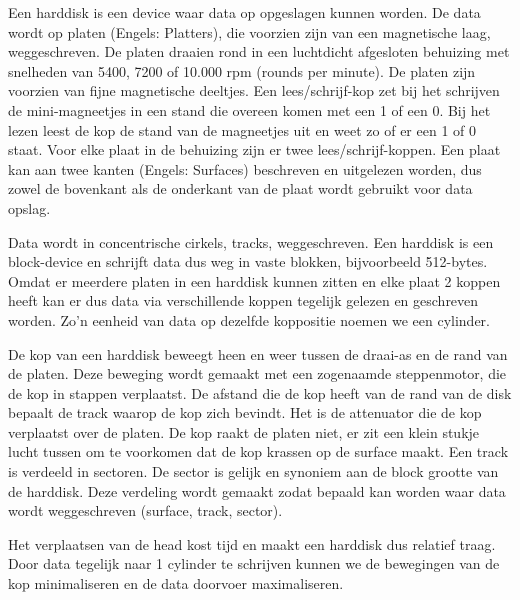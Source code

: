 Een harddisk is een device waar data op opgeslagen kunnen worden. De data wordt op platen (Engels: Platters), die voorzien zijn van een magnetische laag, weggeschreven. De platen draaien rond in een luchtdicht afgesloten behuizing met snelheden van 5400, 7200 of 10.000 rpm (rounds per minute). De platen zijn voorzien van fijne magnetische deeltjes. Een lees/schrijf-kop zet bij het schrijven de mini-magneetjes in een stand die overeen komen met een 1 of een 0. Bij het lezen leest de kop de stand van de magneetjes uit en weet zo of er een 1 of 0 staat. Voor elke plaat in de behuizing zijn er twee lees/schrijf-koppen. Een plaat kan aan twee kanten (Engels: Surfaces) beschreven en uitgelezen worden, dus zowel de bovenkant als de onderkant van de plaat wordt gebruikt voor data opslag.

Data wordt in concentrische cirkels, tracks, weggeschreven. Een harddisk is een block-device en schrijft data dus weg in vaste blokken, bijvoorbeeld 512-bytes. Omdat er meerdere platen in een harddisk kunnen zitten en elke plaat 2 koppen heeft kan er dus data via verschillende koppen tegelijk gelezen en geschreven worden. Zo'n eenheid van data op dezelfde koppositie noemen we een cylinder. 

De kop van een harddisk beweegt heen en weer tussen de draai-as en de rand van de platen. Deze beweging wordt gemaakt met een zogenaamde steppenmotor, die de kop in stappen verplaatst. De afstand die de kop heeft van de rand van de disk bepaalt de track waarop de kop zich bevindt. Het is de attenuator die de kop verplaatst over de platen. De kop raakt de platen niet, er zit een klein stukje lucht tussen om te voorkomen dat de kop krassen op de surface maakt. Een track is verdeeld in sectoren. De sector is gelijk en synoniem aan de block grootte van de harddisk. Deze verdeling wordt gemaakt zodat bepaald kan worden waar data wordt weggeschreven (surface, track, sector).

Het verplaatsen van de head kost tijd en maakt een harddisk dus relatief traag. Door data tegelijk naar 1 cylinder te schrijven kunnen we de bewegingen van de kop minimaliseren en de data doorvoer maximaliseren.
